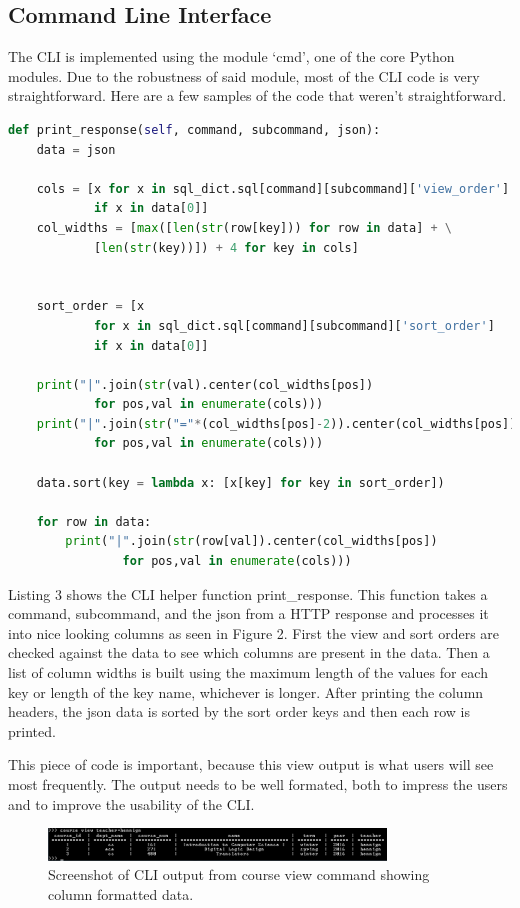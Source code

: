 \documentclass[10pt,draftclsnofoot,onecolumn]{IEEEtran}
\begin{document}
\subsection{Command Line Interface}
The CLI is implemented using the module ‘cmd’, one of the core Python modules.
Due to the robustness of said module, most of the CLI code is very
straightforward. Here are a few samples of the code that weren’t
straightforward.

\begin{lstlisting}[language=Python, caption=CLI code responsible for printing the view commands results returned from the REST API]
def print_response(self, command, subcommand, json):
	data = json

	cols = [x for x in sql_dict.sql[command][subcommand]['view_order'] 
			if x in data[0]]
	col_widths = [max([len(str(row[key])) for row in data] + \
			[len(str(key))]) + 4 for key in cols]


	sort_order = [x 
			for x in sql_dict.sql[command][subcommand]['sort_order'] 
			if x in data[0]]

	print("|".join(str(val).center(col_widths[pos]) 
			for pos,val in enumerate(cols)))
	print("|".join(str("="*(col_widths[pos]-2)).center(col_widths[pos]) 
			for pos,val in enumerate(cols)))

	data.sort(key = lambda x: [x[key] for key in sort_order])

	for row in data:
		print("|".join(str(row[val]).center(col_widths[pos]) 
				for pos,val in enumerate(cols)))
\end{lstlisting}

Listing 3 shows the CLI helper function print\_response. This function takes a
command, subcommand, and the json from a HTTP response and processes it into
nice looking columns as seen in Figure 2. First the view and sort orders are
checked against the data to see which columns are present in the data. Then a
list of column widths is built using the maximum length of the values for each
key or length of the key name, whichever is longer. After printing the column
headers, the json data is sorted by the sort order keys and then each row is
printed.

This piece of code is important, because this view output is what users will
see most frequently. The output needs to be well formated, both to impress the
users and to improve the usability of the CLI.

\begin{figure}[h]
\centering
\includegraphics[width=0.8\textwidth]{senior-project-course-view-output}
\caption{Screenshot of CLI output from course view command showing column formatted data.}
\end{figure}
\end{document}

